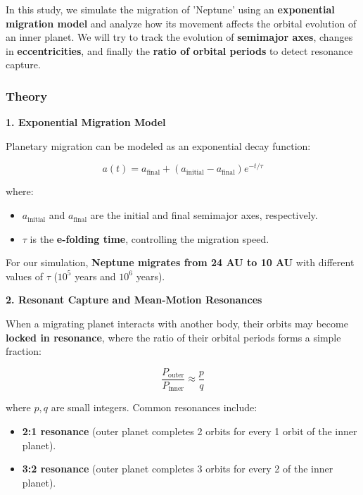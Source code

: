 \documentclass[12pt,a4paper]{article}
\begin{document}
In this study, we simulate the migration of 'Neptune' using an \textbf{exponential migration model} and analyze how its movement affects the orbital evolution of an inner planet. We will try to track the evolution of \textbf{semimajor axes}, changes in \textbf{eccentricities}, and finally the \textbf{ratio of orbital periods} to detect resonance capture.

\subsubsection{Theory}

\textbf{1. Exponential Migration Model}

Planetary migration can be modeled as an exponential decay function:

\begin{equation}
    a(t) = a_{\text{final}} + (a_{\text{initial}} - a_{\text{final}}) e^{-t/\tau}
    \label{eq:a_expo_decay}
\end{equation}

where:
\begin{itemize}
    \item \( a_{\text{initial}} \) and \( a_{\text{final}} \) are the initial and final semimajor axes, respectively.
    \item \( \tau \) is the \textbf{e-folding time}, controlling the migration speed.
\end{itemize}

For our simulation, \textbf{Neptune migrates from 24 AU to 10 AU} with different values of \( \tau \) (\( 10^5 \) years and \( 10^6 \) years). 

\textbf{2. Resonant Capture and Mean-Motion Resonances}

When a migrating planet interacts with another body, their orbits may become \textbf{locked in resonance}, where the ratio of their orbital periods forms a simple fraction:

\begin{equation}
    \frac{P_{\text{outer}}}{P_{\text{inner}}} \approx \frac{p}{q}
\end{equation}

where \( p, q \) are small integers. Common resonances include:
\begin{itemize}
    \item \textbf{2:1 resonance} (outer planet completes 2 orbits for every 1 orbit of the inner planet).
    \item \textbf{3:2 resonance} (outer planet completes 3 orbits for every 2 of the inner planet).
\end{itemize}
\end{document}
